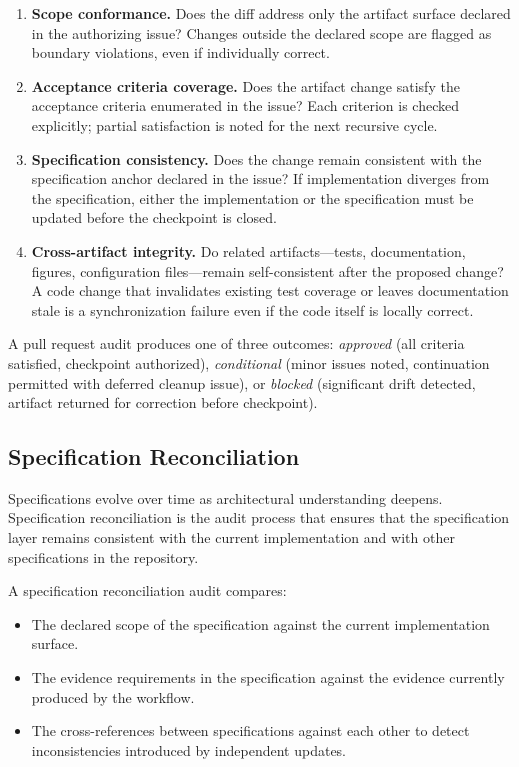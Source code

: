 \begin{enumerate}
  \item \textbf{Scope conformance.} Does the diff address only the artifact surface declared in the authorizing issue? Changes outside the declared scope are flagged as boundary violations, even if individually correct.
  \item \textbf{Acceptance criteria coverage.} Does the artifact change satisfy the acceptance criteria enumerated in the issue? Each criterion is checked explicitly; partial satisfaction is noted for the next recursive cycle.
  \item \textbf{Specification consistency.} Does the change remain consistent with the specification anchor declared in the issue? If implementation diverges from the specification, either the implementation or the specification must be updated before the checkpoint is closed.
  \item \textbf{Cross-artifact integrity.} Do related artifacts---tests, documentation, figures, configuration files---remain self-consistent after the proposed change? A code change that invalidates existing test coverage or leaves documentation stale is a synchronization failure even if the code itself is locally correct.
\end{enumerate}

A pull request audit produces one of three outcomes: \textit{approved} (all criteria satisfied, checkpoint authorized), \textit{conditional} (minor issues noted, continuation permitted with deferred cleanup issue), or \textit{blocked} (significant drift detected, artifact returned for correction before checkpoint).

\subsection{Specification Reconciliation}

Specifications evolve over time as architectural understanding deepens. Specification reconciliation is the audit process that ensures that the specification layer remains consistent with the current implementation and with other specifications in the repository.

A specification reconciliation audit compares:
\begin{itemize}
  \item The declared scope of the specification against the current implementation surface.
  \item The evidence requirements in the specification against the evidence currently produced by the workflow.
  \item The cross-references between specifications against each other to detect inconsistencies introduced by independent updates.
\end{itemize}

